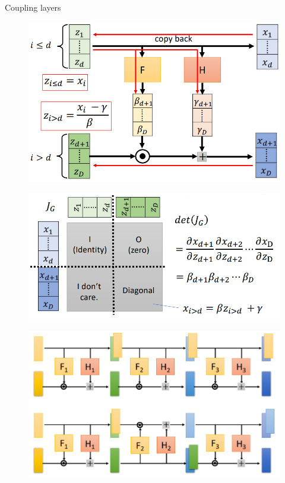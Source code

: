 \begin{frame}[allowframebreaks]{Coupling layers}
\framebreak

\begin{figure}
    \centering
    \includegraphics[height=0.9\textheight, width=\textwidth, keepaspectratio]{images/norm-flow/coupling_layer_2.png}
\end{figure}

\framebreak

\begin{figure}
    \centering
    \includegraphics[height=0.9\textheight, width=\textwidth, keepaspectratio]{images/norm-flow/coupling_layer_3.png}
\end{figure}

\framebreak

\begin{figure}
    \centering
    \includegraphics[height=0.9\textheight, width=\textwidth, keepaspectratio]{images/norm-flow/coupling_layer_4.png}
\end{figure}
    
\end{frame}